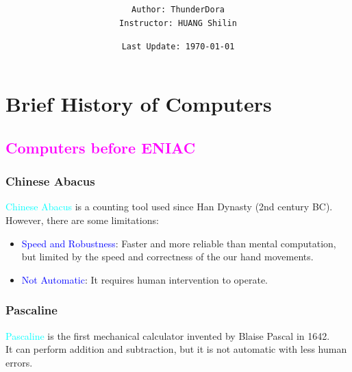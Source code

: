 \documentclass{book}
\title{\Large{\textbf{\texttt{\textcolor{teal}{\fbox{\fbox{\textcolor{purple}{PHYS1007: Quantum Information for Everyone}}}}}}}}
\author{
    \texttt{Author: ThunderDora}\\
    \texttt{Instructor: HUANG Shilin}
}
\date{
    \vfill
    \texttt{Last Update: \today}
}
\begin{document}
\maketitle

\tableofcontents
\chapter{Brief History of Computers}
\textcolor{magenta}{\section{\textbf{Computers before ENIAC}}}
\subsection{Chinese Abacus}
\textcolor{cyan}{Chinese Abacus} is a counting tool used since Han Dynasty (2nd century BC).\\
However, there are some limitations:
\begin{itemize}
    \item \textcolor{blue}{Speed and Robustness}: Faster and more reliable than mental computation, but limited by the speed and correctness of the our hand movements.
    \item \textcolor{blue}{Not Automatic}: It requires human intervention to operate.
\end{itemize}
\subsection{Pascaline}
\raggedright
\textcolor{cyan}{Pascaline} is the first mechanical calculator invented by Blaise Pascal in 1642.\\
It can perform addition and subtraction, but it is not automatic with less human errors.\\
\end{document}
